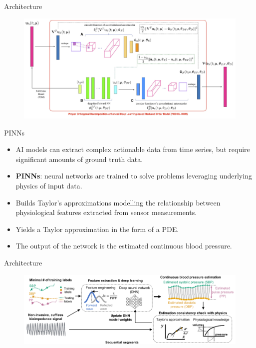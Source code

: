 \documentclass{beamer}
\begin{document}
\begin{frame}{Architecture}
    \begin{figure}
      \centering
      \includegraphics[width=1\linewidth]{images/POD-DL-ROM-archi.png}
      \caption{\textcite{Fresca2021}}
  \end{figure}
\end{frame}

\begin{frame}{PINNs \cite{jafari2022}}
  \begin{itemize}
    \item AI models can extract complex actionable data from time series, but require significant amounts of ground truth data. 
    \item \textbf{PINNs}: neural networks are trained to solve problems leveraging underlying physics of input data.
    \item Builds Taylor's approximations modelling the relationship between physiological features extracted from sensor measurements.
    \item Yields a Taylor approximation in the form of a PDE.
    \item The output of the network is the estimated continuous blood pressure.
  \end{itemize}
\end{frame}

\begin{frame}{Architecture}
    \begin{figure}
      \centering
      \includegraphics[width=1\linewidth]{images/PINNs-archi.png}
      \caption{\textcite{jafari2022}}
  \end{figure}
\end{frame}
\end{document}
